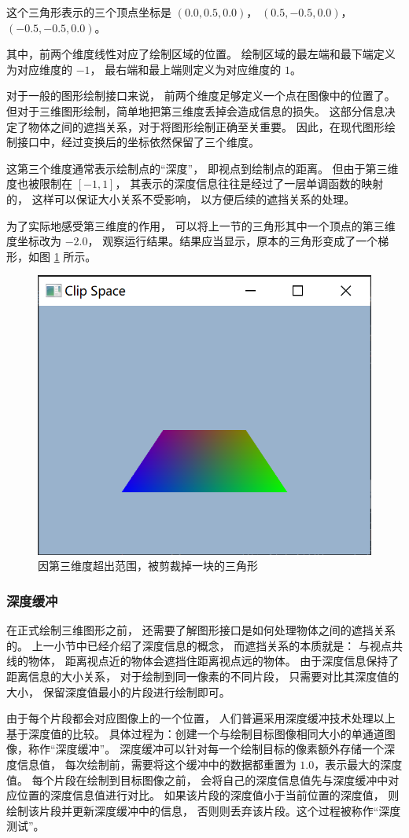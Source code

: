 \documentclass[fontset=windows]{ctexart}
\begin{document}
这个三角形表示的三个顶点坐标是
$(0.0, 0.5, 0.0)$，
$(0.5, -0.5, 0.0)$，
$(-0.5, -0.5, 0.0)$。

其中，前两个维度线性对应了绘制区域的位置。
绘制区域的最左端和最下端定义为对应维度的 $-1$，
最右端和最上端则定义为对应维度的 $1$。

对于一般的图形绘制接口来说，
前两个维度足够定义一个点在图像中的位置了。
但对于三维图形绘制，简单地把第三维度丢掉会造成信息的损失。
这部分信息决定了物体之间的遮挡关系，对于将图形绘制正确至关重要。
因此，在现代图形绘制接口中，经过变换后的坐标依然保留了三个维度。

这第三个维度通常表示绘制点的“深度”，
即视点到绘制点的距离。
但由于第三维度也被限制在 $[-1, 1]$，
其表示的深度信息往往是经过了一层单调函数的映射的，
这样可以保证大小关系不受影响，
以方便后续的遮挡关系的处理。

为了实际地感受第三维度的作用，
可以将上一节的三角形其中一个顶点的第三维度坐标改为 $-2.0$，
观察运行结果。结果应当显示，原本的三角形变成了一个梯形，如图
\ref{fig-gl:clipped-triangle}
所示。

\begin{figure}[htbp]
\centering
\includegraphics[width=0.5\linewidth]{imgs/sec 4.2/clipped-triangle.png}
\caption{因第三维度超出范围，被剪裁掉一块的三角形}
\label{fig-gl:clipped-triangle}
\end{figure}

\subsubsection{深度缓冲}

在正式绘制三维图形之前，
还需要了解图形接口是如何处理物体之间的遮挡关系的。
上一小节中已经介绍了深度信息的概念，
而遮挡关系的本质就是：
与视点共线的物体，
距离视点近的物体会遮挡住距离视点远的物体。
由于深度信息保持了距离信息的大小关系，
对于绘制到同一像素的不同片段，
只需要对比其深度值的大小，
保留深度值最小的片段进行绘制即可。

由于每个片段都会对应图像上的一个位置，
人们普遍采用深度缓冲技术处理以上基于深度值的比较。
具体过程为：创建一个与绘制目标图像相同大小的单通道图像，称作“深度缓冲”。
深度缓冲可以针对每一个绘制目标的像素额外存储一个深度信息值，
每次绘制前，需要将这个缓冲中的数据都重置为 $1.0$，表示最大的深度值。
每个片段在绘制到目标图像之前，
会将自己的深度信息值先与深度缓冲中对应位置的深度信息值进行对比。
如果该片段的深度值小于当前位置的深度值，
则绘制该片段并更新深度缓冲中的信息，
否则则丢弃该片段。这个过程被称作“深度测试”。
\end{document}
